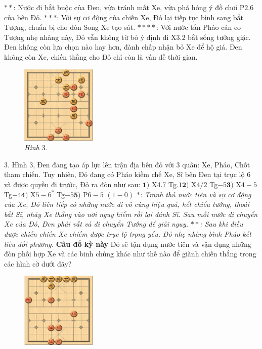 \begin{multicols}{2}
{		\vskip 0.05cm
		$**$: Nước đi bắt buộc của Đen, vừa tránh mất Xe, vừa phá hỏng ý đồ chơi P$2.6$ của bên Đỏ.
		\vskip 0.05cm
		$***$: Với sự cơ động của chiến Xe, Đỏ lại tiếp tục bình sang bắt Tượng, chuẩn bị cho đòn Song Xe tạo sát.
		\vskip 0.05cm
		$****$: Với nước tấn Pháo cản eo Tượng nhẹ nhàng này, Đỏ vẫn không từ bỏ ý định đi X$3.2$ bắt sống tướng giặc. Đen không còn lựa chọn nào hay hơn, đành chấp nhận bỏ Xe để hộ giá. Đen không còn Xe, chiến thắng cho Đỏ chỉ còn là vấn đề thời gian.}
	\begin{figure}[H]
		\vspace*{-5pt}
		\centering
		\captionsetup{labelformat= empty, justification=centering}
		\includegraphics[width= 0.32\textwidth]{3}
		\caption{\small\textit{\color{gocco}Hình $3$.}}
		\vspace*{-10pt}
	\end{figure}
	$3.$ Hình $3$, Đen đang tạo áp lực lên trận địa bên đỏ với $3$ quân: Xe, Pháo, Chốt tham chiến. Tuy nhiên, Đỏ đang có Pháo kiềm chế Xe, Sĩ bên Đen tại trục lộ $6$ và được quyền đi trước, Đỏ ra đòn như sau:
	\vskip 0.05cm
	$\pmb{1)}$ X$4.7$ Tg$.1$\quad $\pmb{2)}$ X$4/2$ Tg$-5$\quad $\pmb{3)}$ X$4-5$ Tg$-4$\quad  $\pmb{4)}$ X$5-6^*$ Tg$-5$\quad $\pmb{5)}$ P$6-5$ $(1-0)$
	\vskip 0.05cm
	\textit{$*$: Tranh thủ nước tiên và sự cơ động của Xe, Đỏ liên tiếp có những nước đi vô cùng hiệu quả, hết chiếu tướng, thoái bắt Sĩ, nhảy Xe thẳng vào nơi nguy hiểm rồi lại đánh Sĩ. Sau mỗi nước di chuyển Xe của Đỏ, Đen phải vất vả di chuyển Tướng để giải nguy.}
	\vskip 0.05cm
		\textit{$**$: Sau khi điều được chiến chiến Xe chiếm được trục lộ trọng yếu, Đỏ nhẹ nhàng bình Pháo kết liễu đối phương.}
		\vskip 0.05cm
		\textbf{\color{gocco}Câu đố kỳ này}
		\vskip 0.05cm
		Đỏ sẽ tận dụng nước tiên và vận dụng những đòn phối hợp Xe và các binh chủng khác như thế nào để giành chiến thắng trong các hình cờ dưới đây?
		\begin{figure}[H]
					\vspace*{-5pt}
					\centering
					\captionsetup{labelformat= empty, justification=centering}
					\includegraphics[width= 0.32\textwidth]{4}

\end{figure}
\end{multicols}
